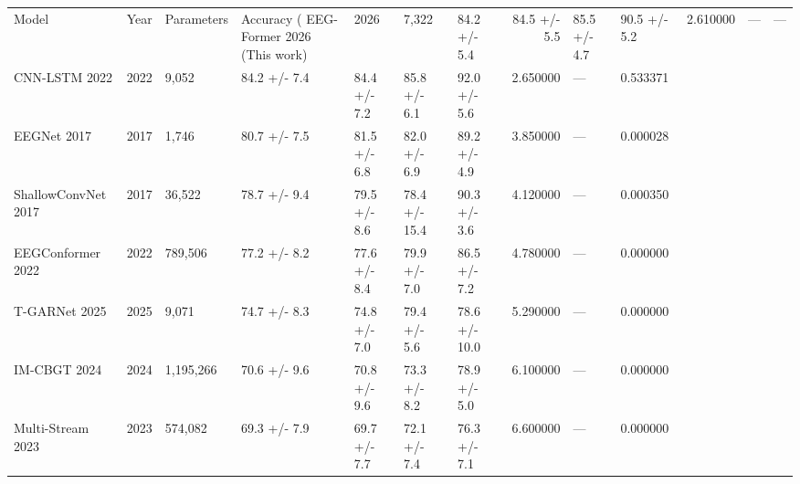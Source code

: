 \begin{tabular}{lrlllllrll}
\toprule
Model & Year & Parameters & Accuracy (%
\midrule
EEG-Former 2026 (This work) & 2026 & 7,322 & 84.2 +/- 5.4 & 84.5 +/- 5.5 & 85.5 +/- 4.7 & 90.5 +/- 5.2 & 2.610000 & — & — \\
CNN-LSTM 2022 & 2022 & 9,052 & 84.2 +/- 7.4 & 84.4 +/- 7.2 & 85.8 +/- 6.1 & 92.0 +/- 5.6 & 2.650000 & — & 0.533371 \\
EEGNet 2017 & 2017 & 1,746 & 80.7 +/- 7.5 & 81.5 +/- 6.8 & 82.0 +/- 6.9 & 89.2 +/- 4.9 & 3.850000 & — & 0.000028 \\
ShallowConvNet 2017 & 2017 & 36,522 & 78.7 +/- 9.4 & 79.5 +/- 8.6 & 78.4 +/- 15.4 & 90.3 +/- 3.6 & 4.120000 & — & 0.000350 \\
EEGConformer 2022 & 2022 & 789,506 & 77.2 +/- 8.2 & 77.6 +/- 8.4 & 79.9 +/- 7.0 & 86.5 +/- 7.2 & 4.780000 & — & 0.000000 \\
T-GARNet 2025 & 2025 & 9,071 & 74.7 +/- 8.3 & 74.8 +/- 7.0 & 79.4 +/- 5.6 & 78.6 +/- 10.0 & 5.290000 & — & 0.000000 \\
IM-CBGT 2024 & 2024 & 1,195,266 & 70.6 +/- 9.6 & 70.8 +/- 9.6 & 73.3 +/- 8.2 & 78.9 +/- 5.0 & 6.100000 & — & 0.000000 \\
Multi-Stream 2023 & 2023 & 574,082 & 69.3 +/- 7.9 & 69.7 +/- 7.7 & 72.1 +/- 7.4 & 76.3 +/- 7.1 & 6.600000 & — & 0.000000 \\
\bottomrule
\end{tabular}
